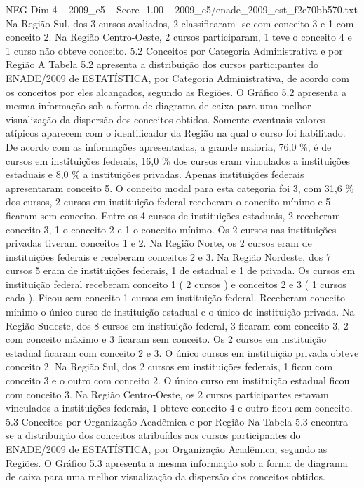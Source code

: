 \begin{textsample}{NEG Dim 4 – 2009\_c5 – Score -1.00 – 2009\_c5/enade\_2009\_est\_f2e70bb570.txt}
Na Região Sul, dos 3 cursos avaliados, 2 classificaram -se com conceito 3 e 1 com conceito 2.
Na Região Centro-Oeste, 2 cursos participaram, 1 teve o conceito 4 e 1 curso não obteve conceito. 5.2 Conceitos por Categoria Administrativa e por Região A Tabela 5.2 apresenta a distribuição dos cursos participantes do ENADE/2009 de ESTATÍSTICA, por Categoria Administrativa, de acordo com os conceitos por eles alcançados, segundo as Regiões.
O Gráfico 5.2 apresenta a mesma informação sob a forma de diagrama de caixa para uma melhor visualização da dispersão dos conceitos obtidos.
Somente eventuais valores atípicos aparecem com o identificador da Região na qual o curso foi habilitado.
De acordo com as informações apresentadas, a grande maioria, 76,0 \%, é de cursos em instituições federais, 16,0 \% dos cursos eram vinculados a instituições estaduais e 8,0 \% a instituições privadas.
Apenas instituições federais apresentaram conceito 5.
O conceito modal para esta categoria foi 3, com 31,6 \% dos cursos, 2 cursos em instituição federal receberam o conceito mínimo e 5 ficaram sem conceito.
Entre os 4 cursos de instituições estaduais, 2 receberam conceito 3, 1 o conceito 2 e 1 o conceito mínimo.
Os 2 cursos nas instituições privadas tiveram conceitos 1 e 2.
Na Região Norte, os 2 cursos eram de instituições federais e receberam conceitos 2 e 3.
Na Região Nordeste, dos 7 cursos 5 eram de instituições federais, 1 de estadual e 1 de privada.
Os cursos em instituição federal receberam conceito 1 ( 2 cursos ) e conceitos 2 e 3 ( 1 cursos cada ).
Ficou sem conceito 1 cursos em instituição federal.
Receberam conceito mínimo o único curso de instituição estadual e o único de instituição privada.
Na Região Sudeste, dos 8 cursos em instituição federal, 3 ficaram com conceito 3, 2 com conceito máximo e 3 ficaram sem conceito.
Os 2 cursos em instituição estadual ficaram com conceito 2 e 3.
O único cursos em instituição privada obteve conceito 2.
Na Região Sul, dos 2 cursos em instituições federais, 1 ficou com conceito 3 e o outro com conceito 2.
O único curso em instituição estadual ficou com conceito 3.
Na Região Centro-Oeste, os 2 cursos participantes estavam vinculados a instituições federais, 1 obteve conceito 4 e outro ficou sem conceito. 5.3 Conceitos por Organização Acadêmica e por Região Na Tabela 5.3 encontra -se a distribuição dos conceitos atribuídos aos cursos participantes do ENADE/2009 de ESTATÍSTICA, por Organização Acadêmica, segundo as Regiões.
O Gráfico 5.3 apresenta a mesma informação sob a forma de diagrama de caixa para uma melhor visualização da dispersão dos conceitos obtidos.

\end{textsample}
